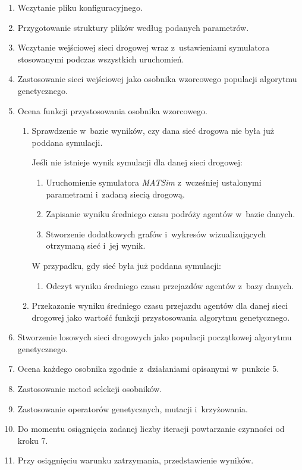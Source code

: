 \documentclass[twoside,12pt]{report}
\begin{document}
\begin{enumerate}
\item Wczytanie pliku konfiguracyjnego.
\item Przygotowanie struktury plików według podanych parametrów.
\item Wczytanie wejściowej sieci drogowej wraz z~ustawieniami symulatora stosowanymi podczas wszystkich uruchomień.
\item Zastosowanie sieci wejściowej jako osobnika wzorcowego populacji algorytmu genetycznego.
\item Ocena funkcji przystosowania osobnika wzorcowego.
\begin{enumerate}
\item Sprawdzenie w~bazie wyników, czy dana sieć drogowa nie była już poddana symulacji.

Jeśli nie istnieje wynik symulacji dla danej sieci drogowej:
\begin{enumerate}
\item Uruchomienie symulatora \textit{MATSim} z~wcześniej ustalonymi parametrami i~zadaną siecią drogową.
\item Zapisanie wyniku średniego czasu podróży agentów w~bazie danych.
\item Stworzenie dodatkowych grafów i~wykresów wizualizujących otrzymaną sieć i~jej wynik.
\end{enumerate}

W przypadku, gdy sieć była już poddana symulacji:
\begin{enumerate}
\item Odczyt wyniku średniego czasu przejazdów agentów z~bazy danych.
\end{enumerate}
\item Przekazanie wyniku średniego czasu przejazdu agentów dla danej sieci drogowej jako wartość funkcji przystosowania algorytmu genetycznego.
\end{enumerate}

\item Stworzenie losowych sieci drogowych jako populacji początkowej algorytmu genetycznego.
\item Ocena każdego osobnika zgodnie z~działaniami opisanymi w~punkcie 5.
\item Zastosowanie metod selekcji osobników.
\item Zastosowanie operatorów genetycznych, mutacji i~krzyżowania.
\item Do momentu osiągnięcia zadanej liczby iteracji powtarzanie czynności od kroku 7.
\item Przy osiągnięciu warunku zatrzymania, przedstawienie wyników.
\end{enumerate}
\end{document}
